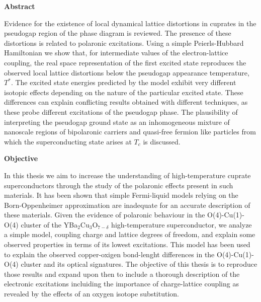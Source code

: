 
\cleardoublepage
{}
{}
\begin{center}
\textbf{\large Abstract}
\end{center}
Evidence for the existence of local dynamical lattice distortions in cuprates in the pseudogap region of the phase diagram is reviewed. 
The presence of these distortions is related to polaronic excitations. 
Using a simple Peierls-Hubbard Hamiltonian we show that, for intermediate values of the electron-lattice coupling, the real space representation of the first excited state reproduces the observed local lattice distortions below the pseudogap appearance temperature, $T^*$. 
The excited state energies predicted by the model exhibit very different isotopic effects depending on the nature of the particular excited state. 
These differences can explain conflicting results obtained with different techniques, as these probe different excitations of the pseudogap phase. 
The plausibility of interpreting the pseudogap ground state as an inhomogeneous mixture of nanoscale regions of bipolaronic carriers and quasi-free fermion like particles from which the superconducting state arises at $T_c$ is discussed.


\cleardoublepage
{}
{}
\begin{center}
\textbf{\large Objective}
\end{center}

In this thesis we aim to increase the understanding of high-temperature cuprate superconductors through the study of the polaronic effects present in such materials.
It has been shown that simple Fermi-liquid models relying on the Born-Oppenheimer approximation are inadequate for an accurate description of these materials.
Given the evidence of polaronic behaviour in the O(4)-Cu(1)-O(4) cluster of the YBa$_2$Cu$_3$O$_{7-\delta}$ high-temperature superconductor, we analyze a simple model, coupling charge and lattice degrees of freedom, and explain some observed properties in terms of its lowest excitations.
This model has been used to explain the observed copper-oxigen bond-lenght differences in the O(4)-Cu(1)-O(4) cluster and its optical signatures.
The objective of this thesis is to reproduce those results and expand upon then to include a thorough description of the electronic excitations incluiding the importance of charge-lattice coupling as revealed by the effects of an oxygen isotope substitution.

